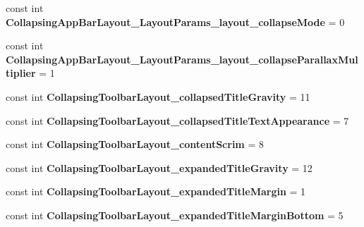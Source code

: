 \begin{DoxyCompactItemize}
\mbox{\label{classXaria_1_1Resource_1_1Styleable_ac2e6554e106429fdc3d11d35a21dc2b6}} 
const int {\bfseries Collapsing\+App\+Bar\+Layout\+\_\+\+Layout\+Params\+\_\+layout\+\_\+collapse\+Mode} = 0
\item 
\mbox{\label{classXaria_1_1Resource_1_1Styleable_a355370bdc108a3f7057886f8961d3485}} 
const int {\bfseries Collapsing\+App\+Bar\+Layout\+\_\+\+Layout\+Params\+\_\+layout\+\_\+collapse\+Parallax\+Multiplier} = 1
\item 
\mbox{\label{classXaria_1_1Resource_1_1Styleable_ab636ab0d30a63a530eeddae7b0357b16}} 
const int {\bfseries Collapsing\+Toolbar\+Layout\+\_\+collapsed\+Title\+Gravity} = 11
\item 
\mbox{\label{classXaria_1_1Resource_1_1Styleable_a2d8af368c808f61f6195355f3efbc13c}} 
const int {\bfseries Collapsing\+Toolbar\+Layout\+\_\+collapsed\+Title\+Text\+Appearance} = 7
\item 
\mbox{\label{classXaria_1_1Resource_1_1Styleable_aebd9da13204d574f5d693af0212bcf5a}} 
const int {\bfseries Collapsing\+Toolbar\+Layout\+\_\+content\+Scrim} = 8
\item 
\mbox{\label{classXaria_1_1Resource_1_1Styleable_a8d9bbc91de10391a5f8632266e77a880}} 
const int {\bfseries Collapsing\+Toolbar\+Layout\+\_\+expanded\+Title\+Gravity} = 12
\item 
\mbox{\label{classXaria_1_1Resource_1_1Styleable_ad1adb6a47c4e94b71f678588fa6dba11}} 
const int {\bfseries Collapsing\+Toolbar\+Layout\+\_\+expanded\+Title\+Margin} = 1
\item 
\mbox{\label{classXaria_1_1Resource_1_1Styleable_a8623a17a327b14f2d1d3e7195e730e1c}} 
const int {\bfseries Collapsing\+Toolbar\+Layout\+\_\+expanded\+Title\+Margin\+Bottom} = 5
\item 
\mbox{\label{classXaria_1_1Resource_1_1Styleable_af8e56d1e1c024988ba3412374f668b4f}} 

\end{DoxyCompactItemize}
